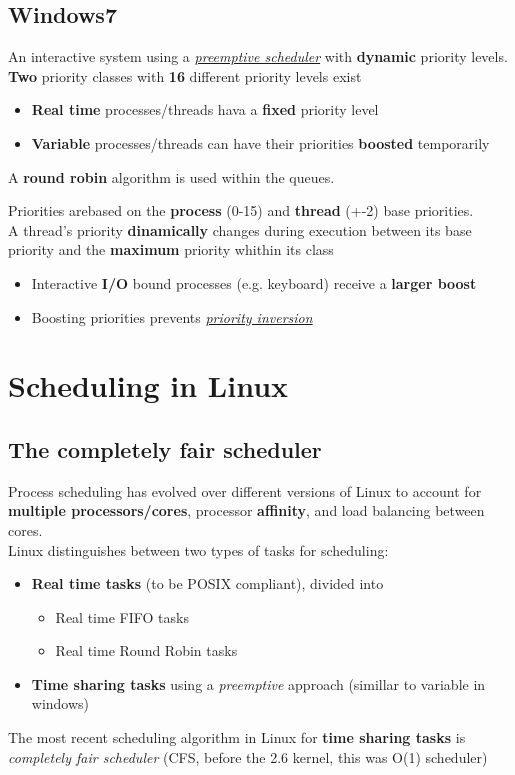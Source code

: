 \documentclass{article}
\newcommand{\worddef}[1]{\hyperref[sec:reference]{\textit{#1}}}
\begin{document}
\subsection{Windows7}
\begin{flushleft}
An interactive system using a \worddef{preemptive scheduler} with \textbf{dynamic} priority levels. \textbf{Two} priority classes with \textbf{16} different priority levels exist
\begin{itemize}
	\item \textbf{Real time} processes/threads hava a \textbf{fixed} priority level
	\item \textbf{Variable} processes/threads can have their priorities \textbf{boosted} temporarily
\end{itemize}
A \textbf{round robin} algorithm is used within the queues.
\smallskip

Priorities arebased on the \textbf{process} (0-15) and \textbf{thread} (+-2) base priorities.\\
A thread's priority \textbf{dinamically} changes during execution between its base priority and the \textbf{maximum} priority whithin its class
\begin{itemize}
	\item Interactive \textbf{I/O} bound processes (e.g. keyboard) receive a \textbf{larger boost}
	\item Boosting priorities prevents \worddef{priority inversion}
\end{itemize}
\end{flushleft}

\section{Scheduling in Linux}

\subsection{The completely fair scheduler}
\begin{flushleft}
Process scheduling has evolved over different versions of Linux to account for \textbf{multiple processors/cores}, processor \textbf{affinity}, and load balancing between cores.\\
Linux distinguishes between two types of tasks for scheduling:
\begin{itemize}
	\item \textbf{Real time tasks} (to be POSIX compliant), divided into
	\begin{itemize}
		\item Real time FIFO tasks
		\item Real time Round Robin tasks
	\end{itemize}
	\item \textbf{Time sharing tasks} using a \textit{preemptive} approach (simillar to variable in windows)
\end{itemize}
The most recent scheduling algorithm in Linux for \textbf{time sharing tasks} is \textit{completely fair scheduler} (CFS, before the 2.6 kernel, this was O(1) scheduler)
\end{flushleft}
\end{document}
